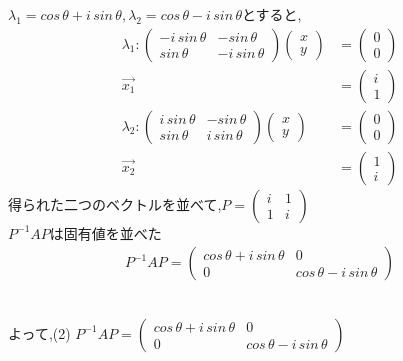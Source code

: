 \documentclass{jsarticle}
\begin{document}
$\lambda_1= cos\,\theta + i\,sin\,\theta , \lambda_2= cos\,\theta - i\,sin\,\theta$とすると,
\begin{align*}
  \lambda_1:\begin{pmatrix}-i\,sin\, \theta &-sin\,\theta \\sin\,\theta &-i\,sin\,\theta \end{pmatrix}
  \begin{pmatrix}x\\y\end{pmatrix} &= \begin{pmatrix}0\\0\end{pmatrix}\\
  \overrightarrow{x_1} &= \begin{pmatrix}i\\1\end{pmatrix}\\
  \lambda_2:\begin{pmatrix}i\,sin\, \theta &-sin\,\theta \\sin\,\theta &i\,sin\,\theta \end{pmatrix}
  \begin{pmatrix}x\\y\end{pmatrix} &= \begin{pmatrix}0\\0\end{pmatrix}\\
  \overrightarrow{x_2} &= \begin{pmatrix}1\\i\end{pmatrix}
\end{align*}  
得られた二つのベクトルを並べて,$P = \begin{pmatrix}i&1\\1&i \end{pmatrix}$
\leavevmode\\
$P^{-1}AP$は固有値を並べた
\begin{align*}
P^{-1}AP =\begin{pmatrix} cos\,\theta + i\,sin\,\theta&0\\0&cos\,\theta - i\,sin\,\theta \end{pmatrix}
\end{align*}  

\leavevmode\\
\raggedleft よって,(2) $P^{-1}AP =\begin{pmatrix} cos\,\theta + i\,sin\,\theta&0\\0&cos\,\theta - i\,sin\,\theta \end{pmatrix}$
\end{document}
